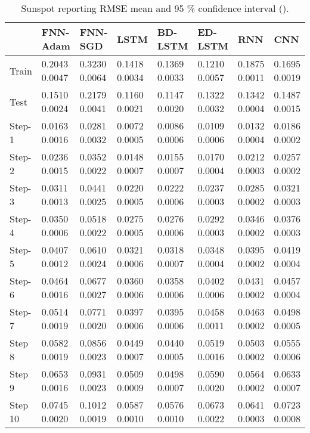 \documentclass{ieeeaccess}
\begin{document}
\begin{table*}[htbp]
 \smaller 
 \caption{Sunspot reporting RMSE mean and 95 \% confidence interval   ().}
\label{tab:sunspot}
\begin{tabular}{llllllll}
\hline
 &  FNN-Adam& FNN-SGD & LSTM & BD-LSTM  & ED-LSTM & RNN & CNN\\
\hline
\hline
							
Train &      
0.2043	0.0047&
0.3230	0.0064&
0.1418	0.0034&
0.1369	0.0033&
0.1210	0.0057&
0.1875	0.0011&0.1695	0.0019\\
Test &      
0.1510	0.0024&
0.2179	0.0041&
0.1160	0.0021&
0.1147	0.0020&
0.1322	0.0032&
0.1342	0.0004&0.1487	0.0015\\
Step-1 &      
0.0163	0.0016&
0.0281	0.0032&
0.0072	0.0005&
0.0086	0.0006&
0.0109	0.0006&
0.0132	0.0004&0.0186	0.0002\\
Step-2 &      
0.0236	0.0015&
0.0352	0.0022&
0.0148	0.0007&
0.0155	0.0007&
0.0170	0.0004&
0.0212	0.0003&0.0257	0.0002\\
Step-3 &      
0.0311	0.0013&
0.0441	0.0025&
0.0220	0.0005&
0.0222	0.0006&
0.0237	0.0003&
0.0285	0.0002&0.0321	0.0003\\
Step-4 &      
0.0350	0.0006&
0.0518	0.0022&
0.0275	0.0005&
0.0276	0.0006&
0.0292	0.0003&
0.0346	0.0002&0.0376	0.0003\\
Step-5 &      
0.0407	0.0012&
0.0610	0.0024&
0.0321	0.0006&
0.0318	0.0007&
0.0348	0.0004&
0.0395	0.0002&	0.0419	0.0004\\
Step-6 &      
0.0464	0.0016&
0.0677	0.0027&
0.0360	0.0006&
0.0358	0.0006&
0.0402	0.0006&
0.0431	0.0002&0.0457	0.0004\\
Step-7 &      
0.0514	0.0019&
0.0771	0.0020&
0.0397	0.0006&
0.0395	0.0006&
0.0458	0.0011&
0.0463	0.0002&	0.0498	0.0005\\
Step 8 &      
0.0582	0.0019&
0.0856	0.0023&
0.0449	0.0007&
0.0440	0.0005&
0.0519	0.0016&
0.0503	0.0002&0.0555	0.0006\\
Step 9 &      
0.0653	0.0016&
0.0931	0.0023&
0.0509	0.0009&
0.0498	0.0007&
0.0590	0.0020&
0.0564	0.0002&	0.0633	0.0007\\
Step 10 &      
0.0745	0.0020&
0.1012	0.0019&
0.0587	0.0010&
0.0576	0.0010&
0.0673	0.0022&
0.0641	0.0003&	0.0723	0.0008\\
\hline
 
\end{tabular}

\end{table*}
\end{document}
